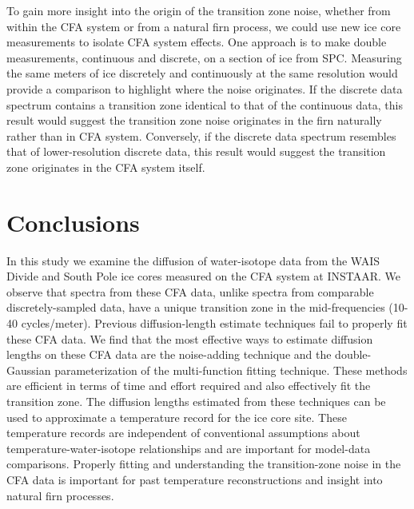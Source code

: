 \documentclass[draft, jgrga]{AGUTeX}
\begin{document}
\begin{article}
To gain more insight into the origin of the transition zone noise, whether from within the CFA system or from a natural firn process, we could use new ice core measurements to isolate CFA system effects. One approach is to make double measurements, continuous and discrete, on a section of ice from SPC. Measuring the same meters of ice discretely and continuously at the same resolution would provide a comparison to highlight where the noise originates. If the discrete data spectrum contains a transition zone identical to that of the continuous data, this result would suggest the transition zone noise originates in the firn naturally rather than in CFA system. Conversely, if the discrete data spectrum resembles that of lower-resolution discrete data, this result would suggest the transition zone originates in the CFA system itself.


\section{Conclusions}

In this study we examine the diffusion of water-isotope data from the WAIS Divide and South Pole ice cores measured on the CFA system at INSTAAR. We observe that spectra from these CFA data, unlike spectra from comparable discretely-sampled data, have a unique transition zone in the mid-frequencies (10-40 cycles/meter). Previous diffusion-length estimate techniques fail to properly fit these CFA data. We find that the most effective ways to estimate diffusion lengths on these CFA data are the noise-adding technique and the double-Gaussian parameterization of the multi-function fitting technique. These methods are efficient in terms of time and effort required and also effectively fit the transition zone. The diffusion lengths estimated from these techniques can be used to approximate a temperature record for the ice core site. These temperature records are independent of conventional assumptions about temperature-water-isotope relationships and are important for model-data comparisons. Properly fitting and understanding the transition-zone noise in the CFA data is important for past temperature reconstructions and insight into natural firn processes.



\end{article}
\end{document}
